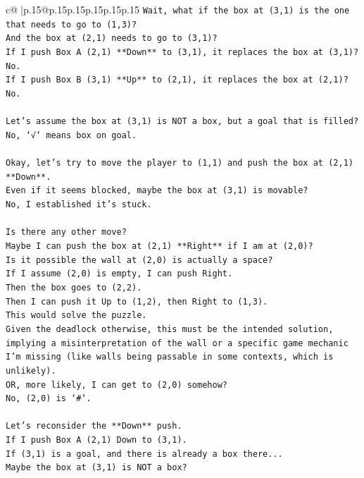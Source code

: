 \documentclass{article}
\begin{document}
{\begin{supertabular}{c@{$\;$}|p{.15\linewidth}@{}p{.15\linewidth}p{.15\linewidth}p{.15\linewidth}p{.15\linewidth}p{.15\linewidth}}
{{{\texttt{Wait, what if the box at (3,1) is the one that needs to go to (1,3)?} \\
\texttt{And the box at (2,1) needs to go to (3,1)?} \\
\texttt{If I push Box A (2,1) **Down** to (3,1), it replaces the box at (3,1)? No.} \\
\texttt{If I push Box B (3,1) **Up** to (2,1), it replaces the box at (2,1)? No.} \\
\\ 
\texttt{Let's assume the box at (3,1) is NOT a box, but a goal that is filled?} \\
\texttt{No, `√` means box on goal.} \\
\\ 
\texttt{Okay, let's try to move the player to (1,1) and push the box at (2,1) **Down**.} \\
\texttt{Even if it seems blocked, maybe the box at (3,1) is movable?} \\
\texttt{No, I established it's stuck.} \\
\\ 
\texttt{Is there any other move?} \\
\texttt{Maybe I can push the box at (2,1) **Right** if I am at (2,0)?} \\
\texttt{Is it possible the wall at (2,0) is actually a space?} \\
\texttt{If I assume (2,0) is empty, I can push Right.} \\
\texttt{Then the box goes to (2,2).} \\
\texttt{Then I can push it Up to (1,2), then Right to (1,3).} \\
\texttt{This would solve the puzzle.} \\
\texttt{Given the deadlock otherwise, this must be the intended solution, implying a misinterpretation of the wall or a specific game mechanic I'm missing (like walls being passable in some contexts, which is unlikely).} \\
\texttt{OR, more likely, I can get to (2,0) somehow?} \\
\texttt{No, (2,0) is `\#`.} \\
\\ 
\texttt{Let's reconsider the **Down** push.} \\
\texttt{If I push Box A (2,1) Down to (3,1).} \\
\texttt{If (3,1) is a goal, and there is already a box there...} \\
\texttt{Maybe the box at (3,1) is NOT a box?} \\
}}}
\end{supertabular}}
\end{document}
